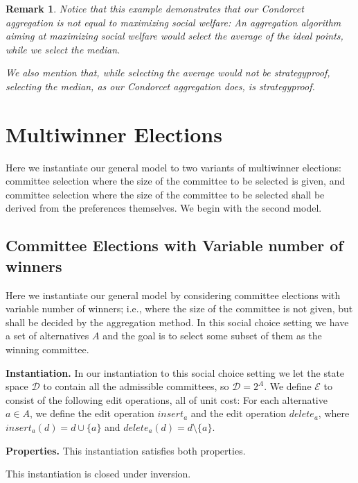 \documentclass[sigconf]{aamas}  %
\newtheorem{remark}{Remark}
\newcommand{\mypara}[1]{\smallskip\noindent\textbf{#1.}}
\newcommand{\calD}{\mathcal{D}}
\newcommand{\calE}{\mathcal{E}}
\begin{document}
\begin{remark}
%
Notice that this example demonstrates that our Condorcet aggregation is not equal to maximizing social welfare:
  An aggregation algorithm aiming at maximizing social welfare would select the average of the ideal points,
  while we select the median.

We also mention that, while selecting the average would not be strategyproof,
selecting the median, as our Condorcet aggregation does, is strategyproof.
%
\end{remark}


\section{Multiwinner Elections}\label{section:commiteee election}

Here we instantiate our general model to two variants of multiwinner elections:
  committee selection where the size of the committee to be selected is given,
  and committee selection where the size of the committee to be selected shall be derived from the preferences themselves.
We begin with the second model.


\subsection{Committee Elections with Variable number of winners}

Here we instantiate our general model by considering committee elections with variable number of winners; i.e., where the size of the committee is not given, but shall be decided by the aggregation method.
In this social choice setting we have a set of alternatives $A$ and the goal is to select some subset of them as the winning committee.


\mypara{Instantiation}
%
In our instantiation to this social choice setting we let the state space $\calD$ to contain all the admissible committees, so $\calD = 2^A$.
We define $\calE$ to consist of the following edit operations, all of unit cost:
  For each alternative $a \in A$, we define the edit operation $insert_a$ and the edit operation $delete_a$,
  where $insert_a(d) = d \cup \{a\}$ and $delete_a(d) = d \setminus \{a\}$.


\mypara{Properties}
%
This instantiation satisfies both properties.

\begin{lemma}
  This instantiation is closed under inversion.
\end{lemma}
\end{document}
